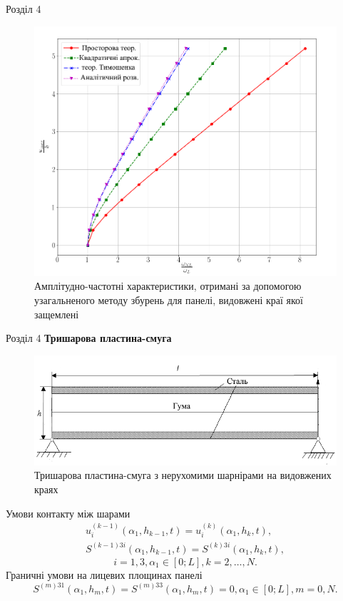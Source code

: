 \documentclass[handout, 8pt]{beamer}
\numberwithin{figure}{section}
\numberwithin{equation}{section}
\numberwithin{table}{section}
\begin{document}
\begin{frame}{Розділ 4}

\begin{figure}
	\includegraphics[scale=0.3]{pic/AFRC1ukr2.png}
		\caption{Амплітудно-частотні характеристики, отримані за допомогою узагальненого методу збурень для панелі, видовжені краї якої защемлені}
		\label{fig:AFR_C}
\end{figure}


\end{frame}

\begin{frame}{Розділ 4}
\textbf{Тришарова пластина-смуга}

\begin{figure}
	\includegraphics[scale=0.4]{pic/plate3layers_ukr.png}
		\caption{Тришарова пластина-смуга з нерухомими шарнірами на видовжених краях}
\end{figure}

Умови контакту між шарами
\begin{gather}
u_i^{(k-1)}\left(\alpha_1, h_{k-1},t \right)=u_i^{(k)}\left(\alpha_1, h_{k},t \right),\\
S^{(k-1)3i}\left(\alpha_1, h_{k-1},t \right)=S^{(k)3i}\left(\alpha_1, h_{k},t \right),
\end{gather}
\[ i=1,3, \alpha_1 \in [0;L], k=2,\dots,N.\]
Граничні умови на лицевих площинах панелі
\begin{equation}
S^{(m)31}\left(\alpha_1, h_{m},t \right)=S^{(m)33}\left(\alpha_1, h_{m},t \right)=0,\alpha_1 \in [0;L], m=0,N.
\end{equation}

\end{frame}
\end{document}
